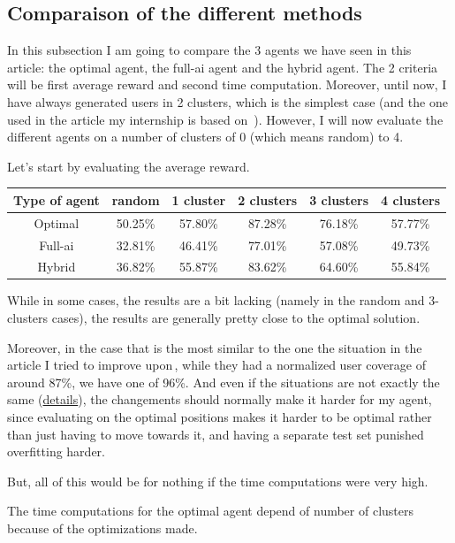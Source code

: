 \documentclass[letterpaper]{article}
\begin{document}
\subsection{Comparaison of the different methods}

In this subsection I am going to compare the 3 agents we have seen in this article: the optimal agent, the full-ai agent and the hybrid agent.
The 2 criteria will be first average reward and second time computation.
Moreover, until now, I have always generated users in 2 clusters, which is the simplest case (and the one used in the article my internship is based on \,\cite{main_article}).
However, I will now evaluate the different agents on a number of clusters of 0 (which means random) to 4.

Let's start by evaluating the average reward.

\begin{center}
    \begin{tabular}{|c|c|c|c|c|c|}
    \hline 
     Type of agent & random & 1 cluster & 2 clusters & 3 clusters & 4 clusters \\ 
     \hline
     Optimal & 50.25\% & 57.80\% & 87.28\% & 76.18\% & 57.77\% \\  
     \hline
     Full-ai & 32.81\% & 46.41\% & 77.01\% & 57.08\% & 49.73\%  \\
     \hline
     Hybrid &  36.82\% & 55.87\% & 83.62\% & 64.60\% & 55.84\%  \\
     \hline
    \end{tabular}
\end{center}

While in some cases, the results are a bit lacking (namely in the random and 3-clusters cases), the results are generally pretty close to the optimal solution.

Moreover, in the case that is the most similar to the one the situation in the article I tried to improve upon\,\cite{main_article}, while they had a normalized user coverage
of around 87\%, we have one of 96\%. And even if the situations are not exactly the same (\hyperref[reinforcement]{details}), the changements should normally make it harder for my agent,
since evaluating on the optimal positions makes it harder to be optimal rather than just having to move towards it,
and having a separate test set punished overfitting harder.

But, all of this would be for nothing if the time computations were very high.

The time computations for the optimal agent depend of number of clusters because of the optimizations made.
\end{document}
